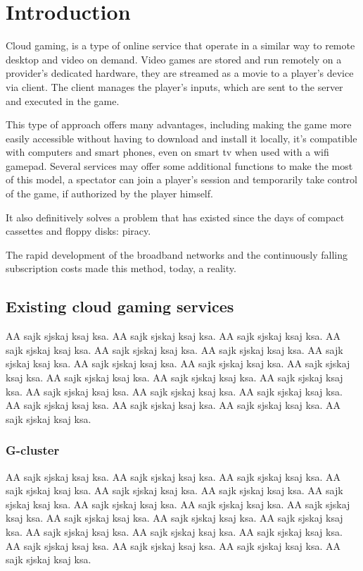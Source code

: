 \chapter{Introduction}
\label{cap:introduction}
Cloud gaming, is a type of online service that operate in a similar way to remote desktop and video on demand. Video games are stored and run remotely on a provider's dedicated hardware, they are streamed as a movie to a player's device via client. The client manages the player's inputs, which are sent to the server and executed in the game.

This type of approach offers many advantages, including making the game more easily accessible without having to download and install it locally, it's compatible with computers and smart phones, even on smart tv when used with a wifi gamepad. Several services may offer some additional functions to make the most of this model, a spectator can join a player's session and temporarily take control of the game, if authorized by the player himself.

It also definitively solves a problem that has existed since the days of compact cassettes and floppy disks: piracy.

The rapid development of the broadband networks and the continuously falling subscription costs made this method, today, a reality.
\section{Existing cloud gaming services}
AA sajk sjskaj ksaj ksa. AA sajk sjskaj ksaj ksa. AA sajk sjskaj ksaj ksa. AA sajk sjskaj ksaj ksa. AA sajk sjskaj ksaj ksa. AA sajk sjskaj ksaj ksa. AA sajk sjskaj ksaj ksa. AA sajk sjskaj ksaj ksa. AA sajk sjskaj ksaj ksa. AA sajk sjskaj ksaj ksa. AA sajk sjskaj ksaj ksa. AA sajk sjskaj ksaj ksa. AA sajk sjskaj ksaj ksa. AA sajk sjskaj ksaj ksa. AA sajk sjskaj ksaj ksa. AA sajk sjskaj ksaj ksa. AA sajk sjskaj ksaj ksa. AA sajk sjskaj ksaj ksa. AA sajk sjskaj ksaj ksa. AA sajk sjskaj ksaj ksa.
\subsection{G-cluster}
AA sajk sjskaj ksaj ksa. AA sajk sjskaj ksaj ksa. AA sajk sjskaj ksaj ksa. AA sajk sjskaj ksaj ksa. AA sajk sjskaj ksaj ksa. AA sajk sjskaj ksaj ksa. AA sajk sjskaj ksaj ksa. AA sajk sjskaj ksaj ksa. AA sajk sjskaj ksaj ksa. AA sajk sjskaj ksaj ksa. AA sajk sjskaj ksaj ksa. AA sajk sjskaj ksaj ksa. AA sajk sjskaj ksaj ksa. AA sajk sjskaj ksaj ksa. AA sajk sjskaj ksaj ksa. AA sajk sjskaj ksaj ksa. AA sajk sjskaj ksaj ksa. AA sajk sjskaj ksaj ksa. AA sajk sjskaj ksaj ksa. AA sajk sjskaj ksaj ksa\cite{Xbox_Game_Pass_cloud_gaming}.
